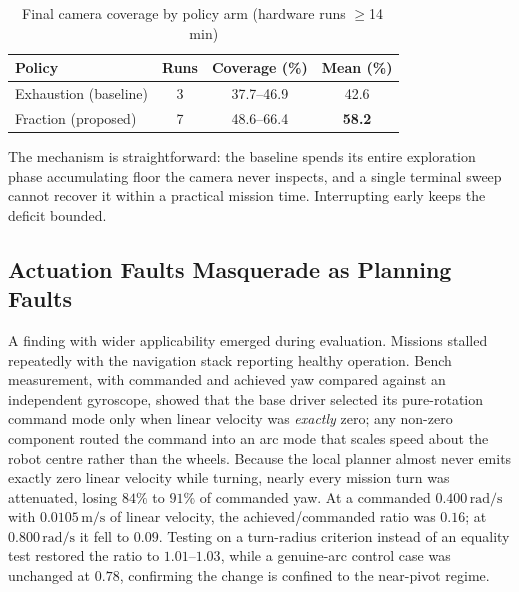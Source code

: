 \documentclass[conference,a4paper,10pt]{IEEEtran}
\begin{document}
\begin{table}[t]
\caption{Final camera coverage by policy arm (hardware runs \(\geq\)14\,min)}
\label{tab:arms}
\centering
\begin{tabular}{lccc}
\toprule
\textbf{Policy} & \textbf{Runs} & \textbf{Coverage (\%)} & \textbf{Mean (\%)} \\
\midrule
Exhaustion (baseline) & 3 & 37.7--46.9 & 42.6 \\
Fraction (proposed)   & 7 & 48.6--66.4 & \textbf{58.2} \\
\bottomrule
\end{tabular}
\end{table}

The mechanism is straightforward: the baseline spends its entire exploration
phase accumulating floor the camera never inspects, and a single terminal sweep
cannot recover it within a practical mission time. Interrupting early keeps the
deficit bounded.

\subsection{Actuation Faults Masquerade as Planning Faults}
A finding with wider applicability emerged during evaluation. Missions stalled
repeatedly with the navigation stack reporting healthy operation. Bench
measurement, with commanded and achieved yaw compared against an independent
gyroscope, showed that the base driver selected its pure-rotation command mode
only when linear velocity was \emph{exactly} zero; any non-zero component
routed the command into an arc mode that scales speed about the robot centre
rather than the wheels. Because the local planner almost never emits exactly
zero linear velocity while turning, nearly every mission turn was attenuated,
losing \(84\%\) to \(91\%\) of commanded yaw. At a commanded
\(0.400\,\mathrm{rad/s}\) with \(0.0105\,\mathrm{m/s}\) of linear
velocity, the achieved/commanded ratio was \(0.16\); at
\(0.800\,\mathrm{rad/s}\) it fell to \(0.09\). Testing on a turn-radius
criterion instead of an equality test restored the ratio to \(1.01\)--\(1.03\),
while a genuine-arc control case was unchanged at \(0.78\), confirming the
change is confined to the near-pivot regime.
\end{document}
